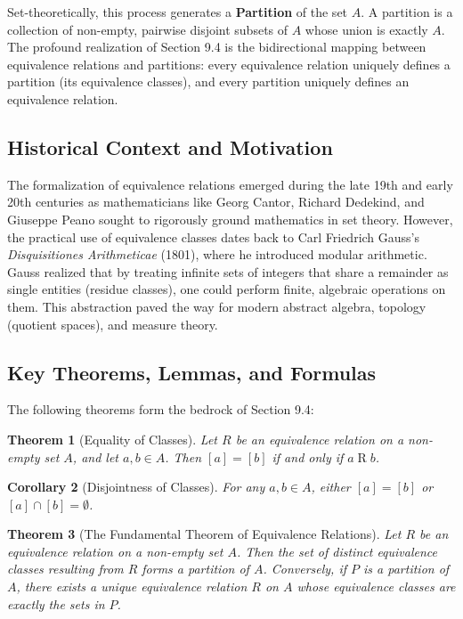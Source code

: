 \documentclass[11pt, a4paper]{article}
\newtheorem{theorem}{Theorem}[section]
\newtheorem{corollary}[theorem]{Corollary}
\theoremstyle{definition}
\theoremstyle{remark}
\begin{document}
Set-theoretically, this process generates a \textbf{Partition} of the set $A$. A partition is a collection of non-empty, pairwise disjoint subsets of $A$ whose union is exactly $A$. The profound realization of Section 9.4 is the bidirectional mapping between equivalence relations and partitions: every equivalence relation uniquely defines a partition (its equivalence classes), and every partition uniquely defines an equivalence relation.

\subsection{Historical Context and Motivation}
The formalization of equivalence relations emerged during the late 19th and early 20th centuries as mathematicians like Georg Cantor, Richard Dedekind, and Giuseppe Peano sought to rigorously ground mathematics in set theory. However, the practical use of equivalence classes dates back to Carl Friedrich Gauss's \textit{Disquisitiones Arithmeticae} (1801), where he introduced modular arithmetic. Gauss realized that by treating infinite sets of integers that share a remainder as single entities (residue classes), one could perform finite, algebraic operations on them. This abstraction paved the way for modern abstract algebra, topology (quotient spaces), and measure theory.

\subsection{Key Theorems, Lemmas, and Formulas}
The following theorems form the bedrock of Section 9.4:

\begin{theorem}[Equality of Classes]
Let $R$ be an equivalence relation on a non-empty set $A$, and let $a, b \in A$. Then $[a] = [b]$ if and only if $a \mathrel{R} b$.
\end{theorem}

\begin{corollary}[Disjointness of Classes]
For any $a, b \in A$, either $[a] = [b]$ or $[a] \cap [b] = \emptyset$.
\end{corollary}

\begin{theorem}[The Fundamental Theorem of Equivalence Relations]
Let $R$ be an equivalence relation on a non-empty set $A$. Then the set of distinct equivalence classes resulting from $R$ forms a partition of $A$. Conversely, if $P$ is a partition of $A$, there exists a unique equivalence relation $R$ on $A$ whose equivalence classes are exactly the sets in $P$.
\end{theorem}
\end{document}
